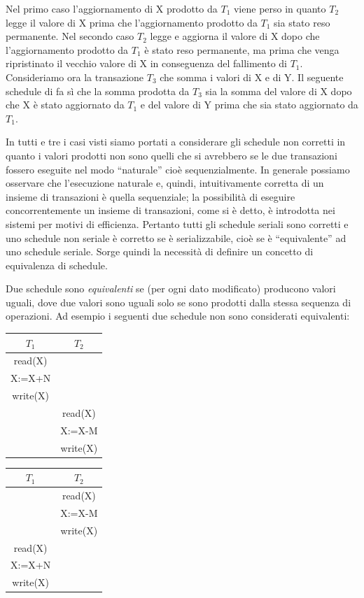 Nel primo caso l'aggiornamento di X prodotto da $T_1$ viene perso in quanto $T_2$ legge il valore di X prima che l'aggiornamento prodotto da $T_1$ sia stato reso permanente. Nel secondo caso $T_2$ legge e aggiorna il valore di X dopo che l'aggiornamento prodotto da $T_1$ è stato reso permanente, ma prima che venga ripristinato il vecchio valore di X in conseguenza del fallimento di $T_1$. Consideriamo ora la transazione $T_3$ che somma i valori di X e di Y. Il seguente schedule di fa sì che la somma prodotta da $T_3$ sia la somma del valore di X dopo che X è stato aggiornato da $T_1$ e del valore di Y prima che sia stato aggiornato da $T_1$.

In tutti e tre i casi visti siamo portati a considerare gli schedule non corretti in quanto i valori prodotti non sono quelli che si avrebbero se le due transazioni fossero eseguite nel modo “naturale” cioè sequenzialmente. In generale possiamo osservare che l'esecuzione naturale e, quindi, intuitivamente corretta di un insieme di transazioni è quella sequenziale; la possibilità di eseguire concorrentemente un insieme di transazioni, come si è detto, è introdotta nei sistemi per motivi di efficienza. Pertanto tutti gli schedule seriali sono corretti e uno schedule non seriale è corretto se è serializzabile, cioè se è “equivalente” ad uno schedule seriale. Sorge quindi la necessità di definire un concetto di equivalenza di schedule.

Due schedule sono \textit{equivalenti} se (per ogni dato modificato) producono valori uguali, dove due valori sono uguali solo se sono prodotti dalla stessa sequenza di operazioni. Ad esempio i seguenti due schedule non sono considerati equivalenti:
\begin{center}
    \begin{tabular}{|c|c|}
        \hline $T_1$&$T_2$ \\\hline
        read(X)& \\
        X:=X+N& \\
        write(X)& \\
        &read(X) \\
        &X:=X-M \\
        &write(X) \\\hline
    \end{tabular}
    \begin{tabular}{|c|c|}
        \hline$T_1$&$T_2$ \\\hline
        &read(X) \\
        &X:=X-M \\
        &write(X) \\
        read(X)& \\
        X:=X+N& \\
        write(X)& \\\hline
    \end{tabular}
\end{center}

